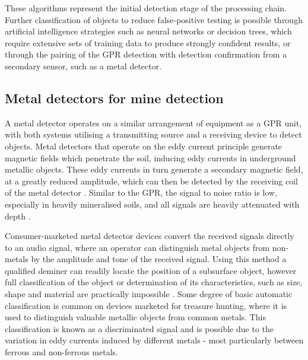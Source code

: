 \documentclass[main.tex]{subfiles}
\begin{document}
These algorithms represent the initial detection stage of the processing chain. Further classification of objects to reduce false-positive testing is possible through artificial intelligence strategies such as neural networks or decision trees, which require extensive sets of training data to produce strongly confident results, or through the pairing of the GPR detection with detection confirmation from a secondary sensor, such as a metal detector.

\subsection{Metal detectors for mine detection}
A metal detector operates on a similar arrangement of equipment as a GPR unit, with both systems utilising a transmitting source and a receiving device to detect objects. Metal detectors that operate on the eddy current principle generate magnetic fields which penetrate the soil, inducing eddy currents in underground metallic objects. These eddy currents in turn generate a secondary magnetic field, at a greatly reduced amplitude, which can then be detected by the receiving coil of the metal detector \parencite{Candy2008}. Similar to the GPR, the signal to noise ratio is low, especially in heavily mineralised soils, and all signals are heavily attenuated with depth \parencite{Candy2008}.

Consumer-marketed metal detector devices convert the received signals directly to an audio signal, where an operator can distinguish metal objects from non-metals by the amplitude and tone of the received signal.  Using this method a qualified deminer can readily locate the position of a subsurface object, however full classification of the object or determination of its characteristics, such as size, shape and material are practically impossible \parencite{Kruger2006}. Some degree of basic automatic classification is common on devices marketed for treasure hunting, where it is used to distinguish valuable metallic objects from common metals. This classification is known as a discriminated signal and is possible due to the variation in eddy currents induced by different metals - most particularly between ferrous and non-ferrous metals. 
\end{document}
